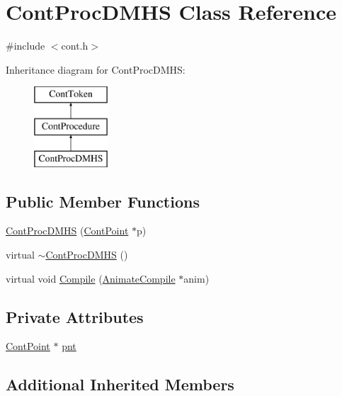 \hypertarget{a00066}{\section{Cont\-Proc\-D\-M\-H\-S Class Reference}
\label{a00066}
}


{\ttfamily \#include $<$cont.\-h$>$}

Inheritance diagram for Cont\-Proc\-D\-M\-H\-S\-:\begin{figure}[H]
\begin{center}
\leavevmode
\includegraphics[height=3.000000cm]{a00066}
\end{center}
\end{figure}
\subsection*{Public Member Functions}
\begin{DoxyCompactItemize}
\item 
\hyperlink{a00066_a3cae677a99c24d80015bcda837e36b18}{Cont\-Proc\-D\-M\-H\-S} (\hyperlink{a00062}{Cont\-Point} $\ast$p)
\item 
virtual \hyperlink{a00066_a1b681a7c36ded763611634186943c1b4}{$\sim$\-Cont\-Proc\-D\-M\-H\-S} ()
\item 
virtual void \hyperlink{a00066_aa12b04f473128f3d07139649ef944317}{Compile} (\hyperlink{a00007}{Animate\-Compile} $\ast$anim)
\end{DoxyCompactItemize}
\subsection*{Private Attributes}
\begin{DoxyCompactItemize}
\item 
\hyperlink{a00062}{Cont\-Point} $\ast$ \hyperlink{a00066_a517ed8f7ba18697cdf76b10c2b95c499}{pnt}
\end{DoxyCompactItemize}
\subsection*{Additional Inherited Members}


